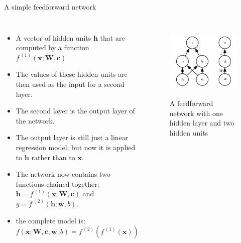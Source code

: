 \documentclass[10pt]{beamer}
\begin{document}
	\begin{frame}{A simple feedforward network}
		\begin{columns}[T]
			\begin{itemize}
					\item A vector of hidden units $\bm{h}$ that are computed by a function $f^{\,(1)}(\bm{x};\bm{W},\bm{c})$
					\item The values of these hidden units are then used as the input for a second layer.
					\item The second layer is the output layer of the network.
					\item The output layer is still just a linear regression model, but now it is applied to $\bm{h}$ rather than to $\bm{x}$.
					\item The network now contains two functions chained together: $\bm{h}=f^{\,(1)}(\bm{x};\bm{W},\bm{c})$ and $y=f^{\,(2)}(\bm{h};\bm{w},b)$.
					\item the complete model is: $f(\bm{x};\bm{W},\bm{c},\bm{w},b)=f^{\,(2)}(f^{\,(1)}(\bm{x}))$
			\end{itemize}
		
			\begin{figure}
				\caption{A feedforward network with one hidden layer and two hidden units}
				\includegraphics[height=10em]{figures/network-one-hidden-layer-two-hidden-unit.png}
			\end{figure}
		\end{columns}
	\end{frame}
\end{document}
